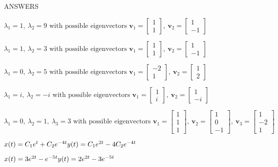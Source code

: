 \documentclass[addpoints, 12pt]{exam}
\begin{document}
\newpage

ANSWERS

\begin{questions}
\question
$\lambda_1 = 1, \> \lambda_2 = 9 \mbox{ with possible eigenvectors } 
\mathbf{v}_1 = \left[ \begin{array}{c}
1 \\ 1
\end{array} \right], \>
\mathbf{v}_2 = \left[ \begin{array}{c}
1 \\ -1
\end{array} \right]$

\question
$\lambda_1 = 1, \> \lambda_2 = 3 \mbox{ with possible eigenvectors } 
\mathbf{v}_1 = \left[ \begin{array}{c}
1 \\ 1
\end{array} \right], \>
\mathbf{v}_2 = \left[ \begin{array}{c}
1 \\ -1
\end{array} \right]$

\question
$\lambda_1 = 0, \> \lambda_2 = 5 \mbox{ with possible eigenvectors } 
\mathbf{v}_1 = \left[ \begin{array}{c}
-2 \\ 1
\end{array} \right], \>
\mathbf{v}_2 = \left[ \begin{array}{c}
1 \\ 2
\end{array} \right]$

\question
$\lambda_1 = i, \> \lambda_2 = -i \mbox{ with possible eigenvectors } 
\mathbf{v}_1 = \left[ \begin{array}{c}
1 \\ i
\end{array} \right], \>
\mathbf{v}_2 = \left[ \begin{array}{c}
1 \\ -i
\end{array} \right]$

\question
$\lambda_1 = 0, \> \lambda_2 = 1, \> \lambda_3 = 3 \mbox{ with possible eigenvectors } 
\mathbf{v}_1 = \left[ \begin{array}{c}
1 \\ 1 \\ 1
\end{array} \right], \>
\mathbf{v}_2 = \left[ \begin{array}{c}
1 \\ 0 \\ -1
\end{array} \right], \>
\mathbf{v}_3 = \left[ \begin{array}{c}
1 \\ -2 \\ 1
\end{array} \right]$

\question
$x(t) = C_1e^{t} + C_2 e^{-4t} \\
y(t) = C_1e^{2t} - 4C_2 e^{-4t}$

\question
$x(t) = 3e^{2t} -e^{-5t} \\
y(t) = 2e^{2t} - 3e^{-5t}$
\end{questions}
\end{document}
